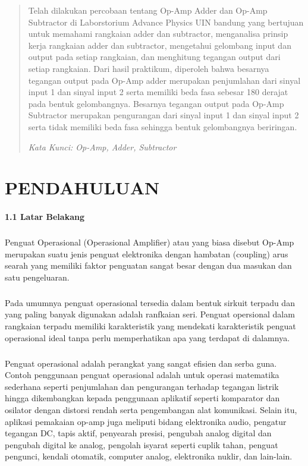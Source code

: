 \documentclass[12pt,a4paper]{article}
\begin{document}
\begin{abstract}
Telah dilakukan percobaan tentang Op-Amp Adder dan Op-Amp Subtractor di Laborstorium Advance Physics UIN bandung yang bertujuan untuk memahami rangkaian adder dan subtractor, menganalisa prinsip kerja rangkaian adder dan subtractor, mengetahui gelombang input dan output pada setiap rangkaian, dan menghitung tegangan output dari setiap rangkaian. Dari hasil praktikum, diperoleh bahwa besarnya tegangan output pada Op-Amp adder merupakan penjumlahan dari sinyal input 1 dan sinyal input 2 serta memiliki beda fasa sebesar 180 derajat pada bentuk gelombangnya. Besarnya tegangan output pada Op-Amp Subtractor merupakan pengurangan dari sinyal input 1 dan sinyal input 2 serta tidak memiliki beda fasa sehingga bentuk gelombangnya beriringan. 

\textit{Kata Kunci: Op-Amp, Adder, Subtractor }
\end{abstract}


\newpage
\section{PENDAHULUAN}
\paragraph{1.1 Latar Belakang}
\subparagraph{ }
	Penguat Operasional (Operasional Amplifier) atau yang biasa disebut Op-Amp merupakan suatu jenis penguat elektronika dengan hambatan (coupling) arus searah yang memiliki faktor penguatan sangat besar dengan dua masukan dan satu pengeluaran.
\subparagraph{ }
	Pada umumnya penguat operasional tersedia dalam bentuk sirkuit terpadu dan yang paling banyak digunakan adalah ranfkaian seri. Penguat opersional dalam rangkaian terpadu memiliki karakteristik yang mendekati karakteristik penguat operasional ideal tanpa perlu memperhatikan apa yang terdapat di dalamnya.
\subparagraph{ }
Penguat operasional adalah perangkat yang sangat efisien dan serba guna. Contoh penggunaan penguat operasional adalah untuk operasi matematika sederhana seperti penjumlahan dan pengurangan terhadap tegangan listrik hingga dikembangkan kepada penggunaan aplikatif seperti komparator dan osilator dengan distorsi rendah serta pengembangan alat komunikasi. Selain itu, aplikasi pemakaian op-amp juga meliputi bidang elektronika audio, pengatur tegangan DC, tapis aktif, penyearah presisi, pengubah analog digital dan pengubah digital ke analog, pengolah isyarat seperti cuplik tahan, penguat pengunci, kendali otomatik, computer analog, elektronika nuklir, dan lain-lain.
\end{document}
